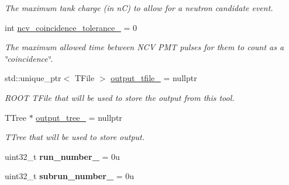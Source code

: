 \begin{DoxyCompactItemize}
\begin{DoxyCompactList}\small\item\em The maximum tank charge (in nC) to allow for a neutron candidate event. \item\end{DoxyCompactList}\item 
\hypertarget{classPhaseITreeMaker_a5487981246c33caa49c30aa09d6f9d98}{
int \hyperlink{classPhaseITreeMaker_a5487981246c33caa49c30aa09d6f9d98}{ncv\_\-coincidence\_\-tolerance\_\-} = 0}
\label{classPhaseITreeMaker_a5487981246c33caa49c30aa09d6f9d98}

\begin{DoxyCompactList}\small\item\em The maximum allowed time between NCV PMT pulses for them to count as a \char`\"{}coincidence\char`\"{}. \item\end{DoxyCompactList}\item 
\hypertarget{classPhaseITreeMaker_a67db041338ed358586fb935775b504aa}{
std::unique\_\-ptr$<$ TFile $>$ \hyperlink{classPhaseITreeMaker_a67db041338ed358586fb935775b504aa}{output\_\-tfile\_\-} = nullptr}
\label{classPhaseITreeMaker_a67db041338ed358586fb935775b504aa}

\begin{DoxyCompactList}\small\item\em ROOT TFile that will be used to store the output from this tool. \item\end{DoxyCompactList}\item 
\hypertarget{classPhaseITreeMaker_ac35cd1936f5733ef3c133058727875f4}{
TTree $\ast$ \hyperlink{classPhaseITreeMaker_ac35cd1936f5733ef3c133058727875f4}{output\_\-tree\_\-} = nullptr}
\label{classPhaseITreeMaker_ac35cd1936f5733ef3c133058727875f4}

\begin{DoxyCompactList}\small\item\em TTree that will be used to store output. \item\end{DoxyCompactList}\item 
\hypertarget{classPhaseITreeMaker_ad73a1ddf206e49fbca71fe62d495c69f}{
uint32\_\-t {\bfseries run\_\-number\_\-} = 0u}
\label{classPhaseITreeMaker_ad73a1ddf206e49fbca71fe62d495c69f}

\item 
\hypertarget{classPhaseITreeMaker_aec7329027d1c43d9ee16a7fcb96bdf17}{
uint32\_\-t {\bfseries subrun\_\-number\_\-} = 0u}
\label{classPhaseITreeMaker_aec7329027d1c43d9ee16a7fcb96bdf17}


\end{DoxyCompactItemize}
